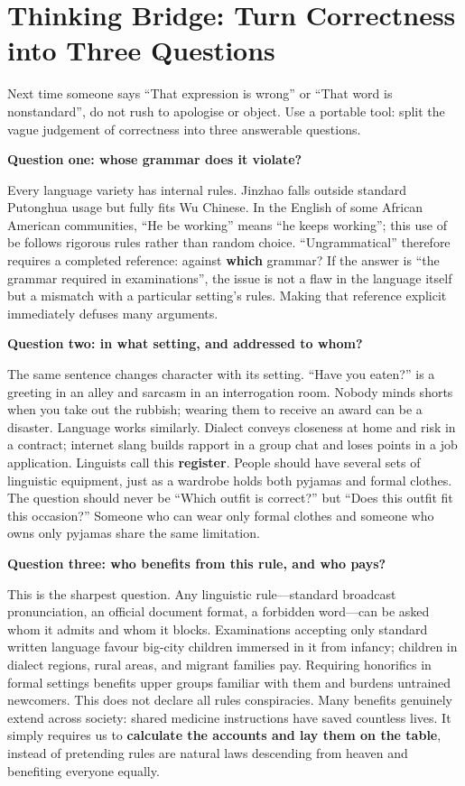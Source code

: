 \section[Thinking Bridge: Three Questions]{Thinking Bridge: Turn Correctness into Three Questions}
Next time someone says ``That expression is wrong'' or ``That word is nonstandard'', do not rush to apologise or object. Use a portable tool: split the vague judgement of correctness into three answerable questions.

\textbf{Question one: whose grammar does it violate?}

Every language variety has internal rules. Jinzhao falls outside standard Putonghua usage but fully fits Wu Chinese. In the English of some African American communities, ``He be working'' means ``he keeps working''; this use of be follows rigorous rules rather than random choice. ``Ungrammatical'' therefore requires a completed reference: against \textbf{which} grammar? If the answer is ``the grammar required in examinations'', the issue is not a flaw in the language itself but a mismatch with a particular setting's rules. Making that reference explicit immediately defuses many arguments.

\textbf{Question two: in what setting, and addressed to whom?}

The same sentence changes character with its setting. ``Have you eaten?'' is a greeting in an alley and sarcasm in an interrogation room. Nobody minds shorts when you take out the rubbish; wearing them to receive an award can be a disaster. Language works similarly. Dialect conveys closeness at home and risk in a contract; internet slang builds rapport in a group chat and loses points in a job application. Linguists call this \textbf{register}. People should have several sets of linguistic equipment, just as a wardrobe holds both pyjamas and formal clothes. The question should never be ``Which outfit is correct?'' but ``Does this outfit fit this occasion?'' Someone who can wear only formal clothes and someone who owns only pyjamas share the same limitation.

\textbf{Question three: who benefits from this rule, and who pays?}

This is the sharpest question. Any linguistic rule---standard broadcast pronunciation, an official document format, a forbidden word---can be asked whom it admits and whom it blocks. Examinations accepting only standard written language favour big-city children immersed in it from infancy; children in dialect regions, rural areas, and migrant families pay. Requiring honorifics in formal settings benefits upper groups familiar with them and burdens untrained newcomers. This does not declare all rules conspiracies. Many benefits genuinely extend across society: shared medicine instructions have saved countless lives. It simply requires us to \textbf{calculate the accounts and lay them on the table}, instead of pretending rules are natural laws descending from heaven and benefiting everyone equally.

